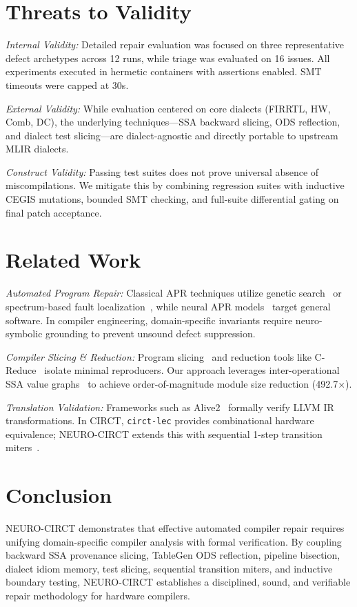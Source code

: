 \documentclass[conference]{IEEEtran}
\begin{document}
\section{Threats to Validity}
\textit{Internal Validity:} Detailed repair evaluation was focused on three representative defect archetypes across 12 runs, while triage was evaluated on 16 issues. All experiments executed in hermetic containers with assertions enabled. SMT timeouts were capped at 30s.

\textit{External Validity:} While evaluation centered on core dialects (FIRRTL, HW, Comb, DC), the underlying techniques---SSA backward slicing, ODS reflection, and dialect test slicing---are dialect-agnostic and directly portable to upstream MLIR dialects.

\textit{Construct Validity:} Passing test suites does not prove universal absence of miscompilations. We mitigate this by combining regression suites with inductive CEGIS mutations, bounded SMT checking, and full-suite differential gating on final patch acceptance.

\section{Related Work}
\textit{Automated Program Repair:} Classical APR techniques utilize genetic search~\cite{legoues2012systematic} or spectrum-based fault localization~\cite{jones2005fault}, while neural APR models~\cite{jimenez2024swebench} target general software. In compiler engineering, domain-specific invariants require neuro-symbolic grounding to prevent unsound defect suppression.

\textit{Compiler Slicing \& Reduction:} Program slicing~\cite{weiser1984slicing} and reduction tools like C-Reduce~\cite{regehr2012creduce} isolate minimal reproducers. Our approach leverages inter-operational SSA value graphs~\cite{lattner2021mlir} to achieve order-of-magnitude module size reduction (492.7$\times$).

\textit{Translation Validation:} Frameworks such as Alive2~\cite{lopes2021alive2} formally verify LLVM IR transformations. In CIRCT, \texttt{circt-lec} provides combinational hardware equivalence; NEURO-CIRCT extends this with sequential 1-step transition miters~\cite{solarlezama2006cegis, biere2003bmc}.

\section{Conclusion}
NEURO-CIRCT demonstrates that effective automated compiler repair requires unifying domain-specific compiler analysis with formal verification. By coupling backward SSA provenance slicing, TableGen ODS reflection, pipeline bisection, dialect idiom memory, test slicing, sequential transition miters, and inductive boundary testing, NEURO-CIRCT establishes a disciplined, sound, and verifiable repair methodology for hardware compilers.
\end{document}
